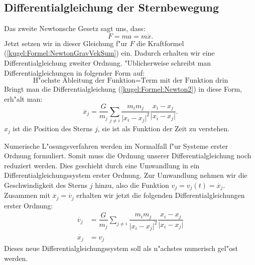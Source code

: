 \begin{refsection}
	\subsection{Differentialgleichung der Sternbewegung}
	Das zweite Newtonsche Gesetz sagt uns, dass:	
	\begin{equation}
		 F = m  a = m \ddot{x}.
		\label{kugel:Formel:Newton2}
	\end{equation}
    Jetzt setzen wir in dieser Gleichung f"ur $F$ die Kraftformel (\ref{kugel:Formel:NewtonGravVekSum}) ein. Dadurch erhalten wir eine Differentialgleichung zweiter Ordnung. "Ublicherweise schreibt man Differentialgleichungen in folgender Form auf:
    $$\text{H"ochste Ableitung der Funktion} = \text{Term mit der Funktion drin}$$
    Bringt man die Differentialgleichung (\ref{kugel:Formel:Newton2}) in diese Form, erh"alt man:
    \begin{equation}
		\ddot{{x_j}} = \dfrac{G}{m_j} \sum_{j \neq i} \dfrac{m_i m_j}{\lvert  x_i -  x_j \lvert^2} \dfrac{x_i -  x_j}{\lvert x_i -  x_j \lvert}.
		\label{kugel:Formel:DGLo2}
	\end{equation}
	$x_j$ ist die Position des Sterns $j$, sie ist als Funktion der Zeit zu verstehen.
	
	Numerische L"osungsverfahren werden im Normalfall f"ur Systeme erster Ordnung formuliert.
	Somit muss die Ordnung unserer Differentialgleichung noch reduziert werden.
	Dies geschieht durch eine Umwandlung in ein Differentialgleichungssystem erster Ordnung.
	Zur Umwandlung nehmen wir die Geschwindigkeit des Sterns $j$ hinzu, also die Funktion $v_j = v_j(t) = \dot{x_j}$.
	Zusammen mit $\ddot{x_j} = \dot{v_j}$ erhalten wir jetzt die folgenden Differentialgleichungen erster Ordnung:
	\begin{equation}
	\begin{aligned}
		\dot{v_j} &= \dfrac{G}{m_j} \sum_{j \neq i} \dfrac{m_i m_j}{\lvert x_i - x_j \lvert^2} \dfrac{x_i - x_j}{\lvert x_i - x_j \lvert} \\
		\dot{x_j} &= v_j
	\end{aligned}
	\label{kugel:Formel:DGLSys}
	\end{equation}
	Dieses neue Differentialgleichungssystem soll als n"achstes numerisch gel"ost werden.
	

\end{refsection}
